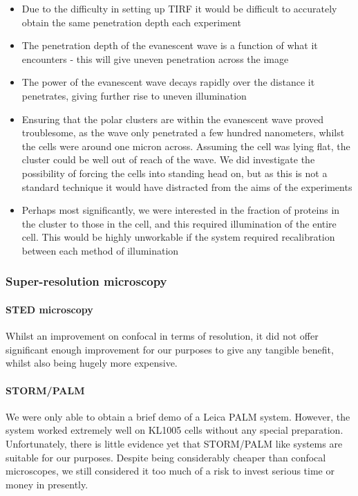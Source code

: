 \documentclass[../main.tex]{subfiles}
\begin{document}
\begin{itemize}
	\item Due to the difficulty in setting up TIRF it would be difficult to accurately obtain the same penetration depth each experiment
	\item The penetration depth of the evanescent wave is a function of what it encounters - this will give uneven penetration across the image
	\item The power of the evanescent wave decays rapidly over the distance it penetrates, giving further rise to uneven illumination
	\item Ensuring that the polar clusters are within the evanescent wave proved troublesome, as the wave only penetrated a few hundred nanometers, whilst the cells were around one micron across. Assuming the cell was lying flat, the cluster could be well out of reach of the wave. We did investigate the possibility of forcing the cells into standing head on, but as this is not a standard technique it would have distracted from the aims of the experiments
	\item Perhaps most significantly, we were interested in the fraction of proteins in the cluster to those in the cell, and this required illumination of the entire cell. This would be highly unworkable if the system required recalibration between each method of illumination
\end{itemize}

\subsubsection{Super-resolution microscopy}

\paragraph{STED microscopy} Whilst an improvement on confocal in terms of resolution, it did not offer significant enough improvement for our purposes to give any tangible benefit, whilst also being hugely more expensive.

\paragraph{STORM/PALM} We were only able to obtain a brief demo of a Leica PALM system. However, the system worked extremely well on KL1005 cells without any special preparation. Unfortunately, there is little evidence yet that STORM/PALM like systems are suitable for our purposes. Despite being considerably cheaper than confocal microscopes, we still considered it too much of a risk to invest serious time or money in presently.
\end{document}
